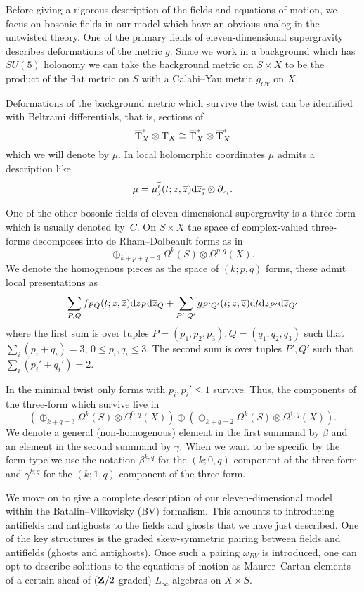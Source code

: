 \documentclass[11pt]{amsart}%
\begin{document}
Before giving a rigorous description of the fields and equations of motion, we focus on bosonic fields in our model which have an obvious analog in the untwisted theory. 
One of the primary fields of eleven-dimensional supergravity describes deformations of the metric $g$.
Since we work in a background which has $SU(5)$ holonomy we can take the background metric on $S \times X$ to be the product of the flat metric on $S$ with a Calabi--Yau metric $g_{CY}$ on $X$. 

Deformations of the background metric which survive the twist can be identified with Beltrami differentials, that is, sections of 
\[
\overline{{\rm T}}_X^* \otimes {\rm T}_X \cong \overline{{\rm T}}^*_X \otimes \overline{{\rm T}}_X^* 
\]
which we will denote by $\mu$. 
In local holomorphic coordinates $\mu$ admits a description like
\[
\mu = \mu^{\overline{i}}_j (t;z,\overline{z}) {\rm d} \overline{z}_{\overline{i}} \otimes \partial_{z_i} .
\]

One of the other bosonic fields of eleven-dimensional supergravity is a three-form which is usually denoted by~$C$. 
On $S \times X$ the space of complex-valued three-forms decomposes into de Rham--Dolbeault forms as in
\[
\oplus_{k+p+q=3} \Omega^k(S) \otimes \Omega^{p,q}(X) .
\]
We denote the homogenous pieces as the space of $(k;p,q)$ forms, these admit local presentations as
\[
\sum_{P,Q} f_{PQ} (t;z,\overline{z}) {\rm d} z_P {\rm d} \overline{z}_Q + \sum_{P',Q'} g_{P'Q'}(t;z,\overline{z}) {\rm d} t {\rm d} z_{P'}{\rm d} \overline{z}_{Q'} 
\]
where the first sum is over tuples $P=(p_1,p_2,p_3),Q=(q_1,q_2,q_3)$ such that $\sum_i (p_i + q_i) = 3$, $0 \leq p_i,q_i \leq 3$.
The second sum is over tuples $P',Q'$ such that $\sum_i (p_i'+q_i') = 2$. 

In the minimal twist only forms with $p_i ,p_i'\leq 1$ survive. 
Thus, the components of the three-form which survive live in
\[
\left(\oplus_{k+q = 3} \Omega^k(S) \otimes \Omega^{0,q}(X)\right) \oplus 
\left(\oplus_{k+q = 2} \Omega^k(S) \otimes \Omega^{1,q}(X)\right) .
\]
We denote a general (non-homogenous) element in the first summand by $\beta$ and an element in the second summand by $\gamma$.
When we want to be specific by the form type we use the notation $\beta^{k;q}$ for the $(k;0,q)$ component of the three-form and $\gamma^{k;q}$ for the $(k;1,q)$ component of the three-form.

\parsec[s:Lsugra]

We move on to give a complete description of our eleven-dimensional model within the Batalin--Vilkovisky (BV) formalism.
This amounts to introducing antifields and antighosts to the fields and ghosts that we have just described.
One of the key structures is the graded skew-symmetric pairing between fields and antifields (ghosts and antighosts).
Once such a pairing $\omega_{BV}$ is introduced, one can opt to describe solutions to the equations of motion as Maurer--Cartan elements of a certain sheaf of ($\mathbf{Z}/2$-graded) $L_\infty$ algebras on $X \times S$.
\end{document}
